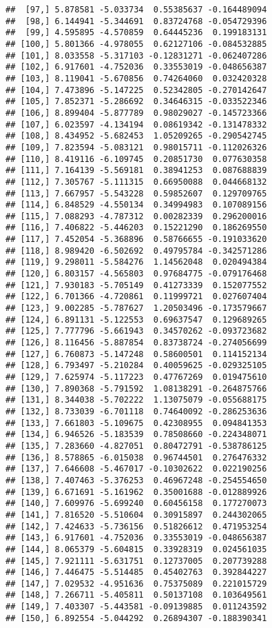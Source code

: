 \documentclass[
]{article}
\begin{document}
\begin{verbatim}
##  [97,] 5.878581 -5.033734  0.55385637 -0.164489094
##  [98,] 6.144941 -5.344691  0.83724768 -0.054729396
##  [99,] 4.595895 -4.570859  0.64445236  0.199183131
## [100,] 5.801366 -4.978055  0.62127106 -0.084532885
## [101,] 8.033558 -5.317103 -0.12831271 -0.062407286
## [102,] 6.917601 -4.752036  0.33553019 -0.048656387
## [103,] 8.119041 -5.670856  0.74264060  0.032420328
## [104,] 7.473896 -5.147225  0.52342805 -0.270142647
## [105,] 7.852371 -5.286692  0.34646315 -0.033522346
## [106,] 8.899404 -5.877789  0.98029027 -0.145723366
## [107,] 6.023597 -4.134194  0.08619342 -0.131478332
## [108,] 8.434952 -5.682453  1.05209265 -0.290542745
## [109,] 7.823594 -5.083121  0.98015711 -0.112026326
## [110,] 8.419116 -6.109745  0.20851730  0.077630358
## [111,] 7.164139 -5.569181  0.38941253  0.087688839
## [112,] 7.305767 -5.111315  0.66950088  0.044668132
## [113,] 7.667957 -5.543228  0.59852607  0.129709765
## [114,] 6.848529 -4.550134  0.34994983  0.107089156
## [115,] 7.088293 -4.787312  0.00282339  0.296200016
## [116,] 7.406822 -5.446203  0.15221290  0.186269550
## [117,] 7.452054 -5.368896  0.58766655 -0.191033620
## [118,] 8.989420 -6.502692  0.49795784 -0.342571286
## [119,] 9.298011 -5.584276  1.14562048  0.020494384
## [120,] 6.803157 -4.565803  0.97684775 -0.079176468
## [121,] 7.930183 -5.705149  0.41273339  0.152077552
## [122,] 6.701366 -4.720861  0.11999721  0.027607404
## [123,] 9.002285 -5.787627  1.20503496 -0.173579667
## [124,] 6.891131 -5.122553  0.69637547  0.129689265
## [125,] 7.777796 -5.661943  0.34570262 -0.093723682
## [126,] 8.116456 -5.887854  0.83738724 -0.274056699
## [127,] 6.760873 -5.147248  0.58600501  0.114152134
## [128,] 6.793497 -5.210284  0.40059625 -0.029325105
## [129,] 7.625974 -5.117223  0.47767269  0.019475610
## [130,] 7.890368 -5.791592  1.08138291 -0.264875766
## [131,] 8.344038 -5.702222  1.13075079 -0.055688175
## [132,] 8.733039 -6.701118  0.74640092 -0.286253636
## [133,] 7.661803 -5.109675  0.42308955  0.094841353
## [134,] 6.946526 -5.183539  0.78508660 -0.224348071
## [135,] 7.283660 -4.827051  0.80472791 -0.538786125
## [136,] 8.578865 -6.015038  0.96744501  0.276476332
## [137,] 7.646608 -5.467017 -0.10302622  0.022190256
## [138,] 7.407463 -5.376253  0.46967248 -0.254554650
## [139,] 6.671691 -5.161962  0.35001688 -0.012889926
## [140,] 7.609976 -5.699240  0.60456158  0.177270073
## [141,] 7.816520 -5.510604  0.30915897  0.244302065
## [142,] 7.424633 -5.736156  0.51826612  0.471953254
## [143,] 6.917601 -4.752036  0.33553019 -0.048656387
## [144,] 8.065379 -5.604815  0.33928319  0.024561035
## [145,] 7.921111 -5.631751  0.12737005  0.207739288
## [146,] 7.446475 -5.514485  0.45402763  0.392844227
## [147,] 7.029532 -4.951636  0.75375089  0.221015729
## [148,] 7.266711 -5.405811  0.50137108  0.103649561
## [149,] 7.403307 -5.443581 -0.09139885  0.011243592
## [150,] 6.892554 -5.044292  0.26894307 -0.188390341
\end{verbatim}
\end{document}
